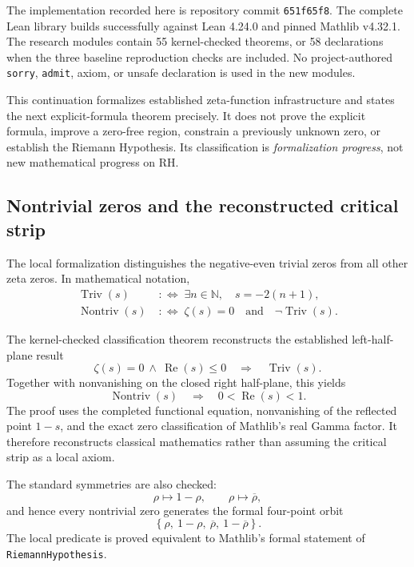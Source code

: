 \documentclass[11pt,a4paper]{article}
\newcommand{\code}[1]{\texttt{#1}}
\newcommand{\RePart}{\operatorname{Re}}
\begin{document}
The implementation recorded here is repository commit
\code{651f65f8}. The complete Lean library builds successfully against Lean
4.24.0 and pinned Mathlib v4.32.1. The research modules contain 55
kernel-checked theorems, or 58 declarations when the three baseline
reproduction checks are included. No project-authored \code{sorry},
\code{admit}, axiom, or unsafe declaration is used in the new modules.

\begin{truthbox}
This continuation formalizes established zeta-function infrastructure and
states the next explicit-formula theorem precisely. It does not prove the
explicit formula, improve a zero-free region, constrain a previously unknown
zero, or establish the Riemann Hypothesis. Its classification is
\emph{formalization progress}, not new mathematical progress on RH.
\end{truthbox}

\subsection{Nontrivial zeros and the reconstructed critical strip}

The local formalization distinguishes the negative-even trivial zeros from all
other zeta zeros. In mathematical notation,
\begin{align*}
  \operatorname{Triv}(s)
    &\;:\Longleftrightarrow\;
      \exists n\in\mathbb N,\quad s=-2(n+1),\\
  \operatorname{Nontriv}(s)
    &\;:\Longleftrightarrow\;
      \zeta(s)=0\quad\text{and}\quad\neg\operatorname{Triv}(s).
\end{align*}

The kernel-checked classification theorem reconstructs the established
left-half-plane result
\[
  \zeta(s)=0\ \wedge\ \RePart(s)\leq 0
  \quad\Longrightarrow\quad
  \operatorname{Triv}(s).
\]
Together with nonvanishing on the closed right half-plane, this yields
\[
  \operatorname{Nontriv}(s)
  \quad\Longrightarrow\quad
  0<\RePart(s)<1.
\]
The proof uses the completed functional equation, nonvanishing of the reflected
point $1-s$, and the exact zero classification of Mathlib's real Gamma factor.
It therefore reconstructs classical mathematics rather than assuming the
critical strip as a local axiom.

The standard symmetries are also checked:
\[
  \rho\longmapsto 1-\rho,
  \qquad
  \rho\longmapsto \overline{\rho},
\]
and hence every nontrivial zero generates the formal four-point orbit
\[
  \left\{\rho,\ 1-\rho,\ \overline{\rho},\
  1-\overline{\rho}\right\}.
\]
The local predicate is proved equivalent to Mathlib's formal statement of
\code{RiemannHypothesis}.
\end{document}
